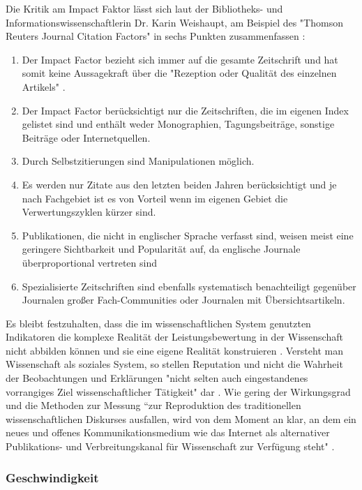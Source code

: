 Die Kritik am Impact Faktor lässt sich laut der Bibliotheks- und Informationswissenschaftlerin Dr. Karin Weishaupt, am Beispiel des "Thomson Reuters Journal Citation Factors" in sechs Punkten zusammenfassen \cite{weishaupt_2009_goldenOA}:
\begin{enumerate}
\item Der Impact Factor bezieht sich immer auf die gesamte Zeitschrift und hat somit keine Aussagekraft über die "Rezeption oder Qualität des einzelnen Artikels" \cite{weishaupt_2009_goldenOA}.
\item Der Impact Factor berücksichtigt nur die Zeitschriften, die im eigenen Index gelistet sind und enthält weder Monographien, Tagungsbeiträge, sonstige Beiträge oder Internetquellen.
\item Durch Selbstzitierungen sind Manipulationen möglich.
\item Es werden nur Zitate aus den letzten beiden Jahren berücksichtigt und je nach Fachgebiet ist es von Vorteil wenn im eigenen Gebiet die Verwertungszyklen kürzer sind.
\item Publikationen, die nicht in englischer Sprache verfasst sind, weisen meist eine geringere Sichtbarkeit und Popularität auf, da englische Journale überproportional vertreten sind
\item Spezialisierte Zeitschriften sind ebenfalls systematisch benachteiligt gegenüber Journalen großer Fach-Communities oder Journalen mit Übersichtsartikeln.
\end{enumerate}

Es bleibt festzuhalten, dass die im wissenschaftlichen System genutzten Indikatoren die komplexe Realität der Leistungsbewertung in der Wissenschaft nicht abbilden können und sie eine eigene Realität konstruieren \cite{Hornbostel_1997}. Versteht man Wissenschaft als soziales System, so stellen Reputation und nicht die Wahrheit der Beobachtungen und Erklärungen "nicht selten auch eingestandenes vorrangiges Ziel wissenschaftlicher Tätigkeit" dar \cite{luhmann_1970_selbststeuerung}. Wie gering der Wirkungsgrad und die Methoden zur Messung “zur Reproduktion des traditionellen wissenschaftlichen Diskurses ausfallen, wird von dem Moment an klar, an dem ein neues und offenes Kommunikationsmedium wie das Internet als alternativer Publikations- und Verbreitungskanal für Wissenschaft zur Verfügung steht" \cite{Rost_1998}.

\subsubsection{Geschwindigkeit}

